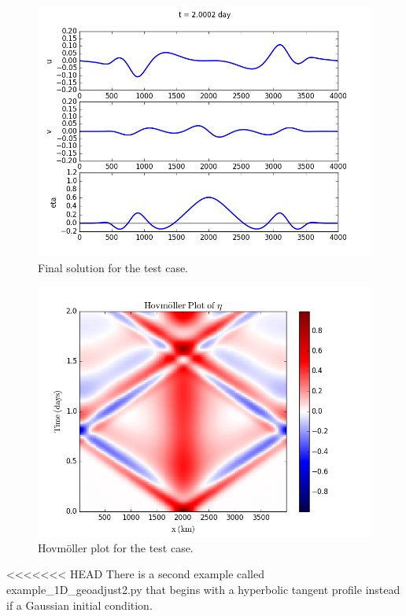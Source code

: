 \documentclass[letterpaper,10pt,english]{sphinxmanual}
\begin{document}
\begin{figure}[htbp]
\centering
\capstart

\includegraphics{ex1_fig1.png}
\caption{Final solution for the test case.}\end{figure}
\begin{figure}[htbp]
\centering
\capstart

\includegraphics{ex1_fig2.png}
\caption{Hovmöller plot for the test case.}\end{figure}

<<<<<<< HEAD
There is a second example called example\_1D\_geoadjust2.py that begins
with a hyperbolic tangent profile instead if a Gaussian initial
condition.
\end{document}
